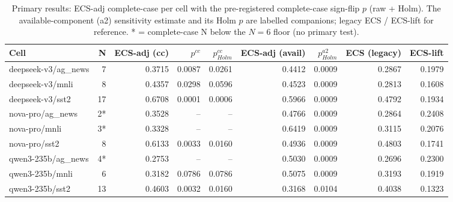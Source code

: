 \begin{table}[t]
\centering
\caption{Primary results: ECS-adj complete-case per cell with the pre-registered complete-case sign-flip $p$ (raw + Holm). The available-component (a2) sensitivity estimate and its Holm $p$ are labelled companions; legacy ECS / ECS-lift for reference. * = complete-case N below the $N{=}6$ floor (no primary test).}
\label{tab:primary}
\begin{tabular}{lrrrrrrrr}
\toprule
Cell & N & ECS-adj (cc) & $p^{cc}$ & $p^{cc}_{Holm}$ & ECS-adj (avail) & $p^{a2}_{Holm}$ & ECS (legacy) & ECS-lift \\
\midrule
deepseek-v3/ag_news & 7 & 0.3715 & 0.0087 & 0.0261 & 0.4412 & 0.0009 & 0.2867 & 0.1979 \\
deepseek-v3/mnli & 8 & 0.4357 & 0.0298 & 0.0596 & 0.4523 & 0.0009 & 0.2813 & 0.1608 \\
deepseek-v3/sst2 & 17 & 0.6708 & 0.0001 & 0.0006 & 0.5966 & 0.0009 & 0.4792 & 0.1934 \\
nova-pro/ag_news & 2* & 0.3528 & -- & -- & 0.4766 & 0.0009 & 0.2864 & 0.2408 \\
nova-pro/mnli & 3* & 0.3328 & -- & -- & 0.6419 & 0.0009 & 0.3115 & 0.2076 \\
nova-pro/sst2 & 8 & 0.6133 & 0.0033 & 0.0160 & 0.4936 & 0.0009 & 0.4803 & 0.1741 \\
qwen3-235b/ag_news & 4* & 0.2753 & -- & -- & 0.5030 & 0.0009 & 0.2696 & 0.2300 \\
qwen3-235b/mnli & 6 & 0.3182 & 0.0786 & 0.0786 & 0.5075 & 0.0009 & 0.3193 & 0.1919 \\
qwen3-235b/sst2 & 13 & 0.4603 & 0.0032 & 0.0160 & 0.3168 & 0.0104 & 0.4038 & 0.1323 \\
\bottomrule
\end{tabular}
\end{table}
